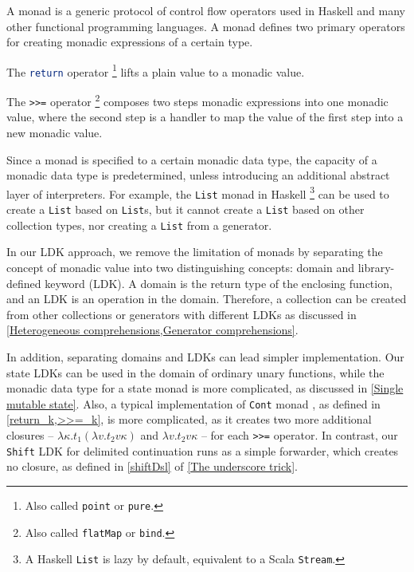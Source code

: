 A monad is a generic protocol of control flow operators used in Haskell and many other functional programming languages. A monad defines two primary operators for creating monadic expressions of a certain type.
\begin{enumerate*}
  \item The \lstinline[language=Haskell,deletekeywords={return}]{return} operator \footnote{Also called \lstinline{point} or \lstinline{pure}.} lifts a plain value to a monadic value.
  \item The \lstinline{>>=} operator \footnote{Also called \lstinline{flatMap} or \lstinline{bind}.} composes two steps monadic expressions into one monadic value, where the second step is a handler to map the value of the first step into a new monadic value.
\end{enumerate*}

Since a monad is specified to a certain monadic data type, the capacity of a monadic data type is predetermined, unless introducing an additional abstract layer of interpreters. For example, the \lstinline{List} monad in Haskell \footnote{A Haskell \lstinline{List} is lazy by default, equivalent to a Scala \lstinline{Stream}.} can be used to create a \lstinline{List} based on \lstinline{List}s, but it cannot create a \lstinline{List} based on other collection types, nor creating a \lstinline{List} from a generator.

In our LDK approach, we remove the limitation of monads by separating the concept of monadic value into two distinguishing concepts: domain and library-defined keyword (LDK). A domain is the return type of the enclosing function, and an LDK is an operation in the domain. Therefore, a collection can be created from other collections or generators with different LDKs as discussed in \cref{Heterogeneous comprehensions,Generator comprehensions}. 

In addition, separating domains and LDKs can lead simpler implementation. Our state LDKs can be used in the domain of ordinary unary functions, while the monadic data type for a state monad is more complicated, as discussed in \cref{Single mutable state}. Also, a typical implementation of \lstinline{Cont} monad \cite{dyvbig2007monadic}, as defined in \cref{return_k,>>=_k}, is more complicated, as it creates two more additional closures -- $\lambda\kappa.t_1\left(\lambda v.t_2 v\kappa\right)$ and $\lambda v.t_2 v\kappa$ -- for each \lstinline{>>=} operator. In contrast, our \lstinline{Shift} LDK for delimited continuation runs as a simple forwarder, which creates no closure, as defined in \cref{shiftDsl} of \cref{The underscore trick}.


